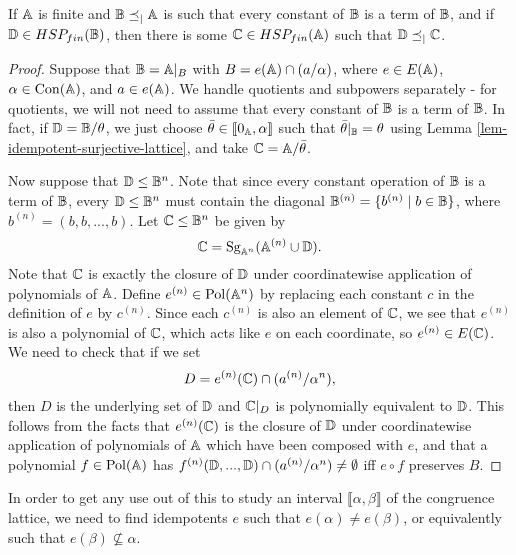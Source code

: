 \begin{appendices}

\begin{prop}\label{prop-restrict-variety} If $\mathbb{A}$ is finite and $\mathbb{B} \preceq_| \mathbb{A}$ is such that every constant of $\mathbb{B}$ is a term of $\mathbb{B}$, and if $\mathbb{D} \in HSP_{fin}(\mathbb{B})$, then there is some $\mathbb{C} \in HSP_{fin}(\mathbb{A})$ such that $\mathbb{D} \preceq_| \mathbb{C}$.
\end{prop}
\begin{proof} Suppose that $\mathbb{B} = \mathbb{A}|_B$ with $B = e(\mathbb{A}) \cap (a/\alpha)$, where $e \in E(\mathbb{A})$, $\alpha \in \operatorname{Con}(\mathbb{A})$, and $a \in e(\mathbb{A})$. We handle quotients and subpowers separately - for quotients, we will not need to assume that every constant of $\mathbb{B}$ is a term of $\mathbb{B}$. In fact, if $\mathbb{D} = \mathbb{B}/\theta$, we just choose $\bar{\theta} \in \llbracket 0_{\mathbb{A}}, \alpha \rrbracket$ such that $\bar{\theta}|_{\mathbb{B}} = \theta$ using Lemma \ref{lem-idempotent-surjective-lattice}, and take $\mathbb{C} = \mathbb{A}/\bar{\theta}$.

Now suppose that $\mathbb{D} \le \mathbb{B}^n$. Note that since every constant operation of $\mathbb{B}$ is a term of $\mathbb{B}$, every $\mathbb{D} \le \mathbb{B}^n$ must contain the diagonal $\mathbb{B}^{(n)} = \{b^{(n)} \mid b \in \mathbb{B}\}$, where $b^{(n)} = (b, b, ..., b)$. Let $\mathbb{C} \le \mathbb{B}^n$ be given by
\[
\mathbb{C} = \operatorname{Sg}_{\mathbb{A}^n}(\mathbb{A}^{(n)} \cup \mathbb{D}).
\]
Note that $\mathbb{C}$ is exactly the closure of $\mathbb{D}$ under coordinatewise application of polynomials of $\mathbb{A}$. Define $e^{(n)} \in \operatorname{Pol}(\mathbb{A}^n)$ by replacing each constant $c$ in the definition of $e$ by $c^{(n)}$. Since each $c^{(n)}$ is also an element of $\mathbb{C}$, we see that $e^{(n)}$ is also a polynomial of $\mathbb{C}$, which acts like $e$ on each coordinate, so $e^{(n)} \in E(\mathbb{C})$. We need to check that if we set
\[
D = e^{(n)}(\mathbb{C}) \cap (a^{(n)}/\alpha^n),
\]
then $D$ is the underlying set of $\mathbb{D}$ and $\mathbb{C}|_D$ is polynomially equivalent to $\mathbb{D}$. This follows from the facts that $e^{(n)}(\mathbb{C})$ is the closure of $\mathbb{D}$ under coordinatewise application of polynomials of $\mathbb{A}$ which have been composed with $e$, and that a polynomial $f \in \operatorname{Pol}(\mathbb{A})$ has $f^{(n)}(\mathbb{D}, ..., \mathbb{D}) \cap (a^{(n)}/\alpha^n) \ne \emptyset$ iff $e \circ f$ preserves $B$.
\end{proof}

In order to get any use out of this to study an interval $\llbracket \alpha, \beta \rrbracket$ of the congruence lattice, we need to find idempotents $e$ such that $e(\alpha) \ne e(\beta)$, or equivalently such that $e(\beta) \not\subseteq \alpha$.


\end{appendices}
